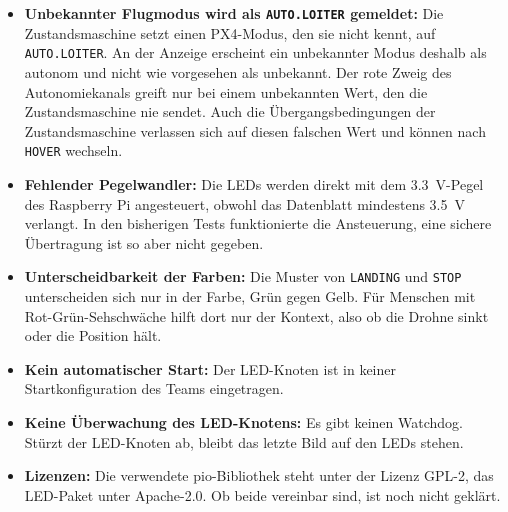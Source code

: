     \begin{itemize}
        \item \textbf{Unbekannter Flugmodus wird als \texttt{AUTO.LOITER} gemeldet:} Die Zustandsmaschine setzt einen
        PX4-Modus, den sie nicht kennt, auf \texttt{AUTO.LOITER}. An der Anzeige erscheint ein unbekannter Modus deshalb
        als autonom und nicht wie vorgesehen als unbekannt. Der rote Zweig des Autonomiekanals greift nur bei einem
        unbekannten Wert, den die Zustandsmaschine nie sendet. Auch die Übergangsbedingungen der Zustandsmaschine
        verlassen sich auf diesen falschen Wert und können nach \texttt{HOVER} wechseln.
        \item \textbf{Fehlender Pegelwandler:} Die LEDs werden direkt mit dem \SI{3,3}{\volt}-Pegel des Raspberry Pi
        angesteuert, obwohl das Datenblatt mindestens \SI{3,5}{\volt} verlangt. In den bisherigen Tests funktionierte
        die Ansteuerung, eine sichere Übertragung ist so aber nicht gegeben.
        \item \textbf{Unterscheidbarkeit der Farben:} Die Muster von \texttt{LANDING} und \texttt{STOP} unterscheiden
        sich nur in der Farbe, Grün gegen Gelb. Für Menschen mit Rot-Grün-Sehschwäche hilft dort nur der Kontext, also
        ob die Drohne sinkt oder die Position hält.
        \item \textbf{Kein automatischer Start:} Der LED-Knoten ist in keiner Startkonfiguration des Teams eingetragen.
        \item \textbf{Keine Überwachung des LED-Knotens:} Es gibt keinen Watchdog. Stürzt der LED-Knoten ab, bleibt das
        letzte Bild auf den LEDs stehen.
        \item \textbf{Lizenzen:} Die verwendete \gls{pio}-Bibliothek steht unter der Lizenz GPL-2, das LED-Paket unter
        Apache-2.0. Ob beide vereinbar sind, ist noch nicht geklärt.
    \end{itemize}
